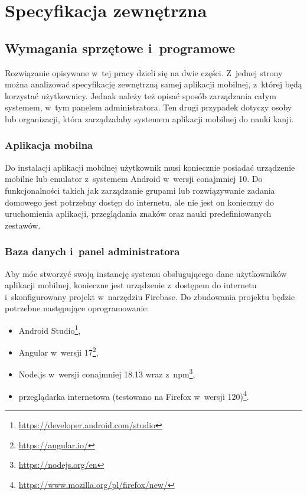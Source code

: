 \documentclass[a4paper,twoside,12pt]{book}
\begin{document}
\chapter{Specyfikacja zewnętrzna}
\label{ch:04}

\section{Wymagania sprzętowe i~programowe}
Rozwiązanie opisywane w~tej pracy dzieli się na dwie części. Z~jednej strony można analizować specyfikację zewnętrzną samej aplikacji mobilnej, z~której będą korzystać użytkownicy. Jednak należy też opisać sposób zarządzania całym systemem, w~tym panelem administratora. Ten drugi przypadek dotyczy osoby lub organizacji, która zarządzałaby systemem aplikacji mobilnej do nauki kanji.

\subsection{Aplikacja mobilna}

Do instalacji aplikacji mobilnej użytkownik musi koniecznie posiadać urządzenie mobilne lub emulator z~systemem Android w~wersji conajmniej 10. Do funkcjonalności takich jak zarządzanie grupami lub rozwiązywanie zadania domowego jest potrzebny dostęp do internetu, ale nie jest on konieczny do uruchomienia aplikacji, przeglądania znaków oraz nauki predefiniowanych zestawów. 

\subsection{Baza danych i~panel administratora}

Aby móc stworzyć swoją instancję systemu obsługującego dane użytkowników aplikacji mobilnej, konieczne jest urządzenie z~dostępem do internetu i~skonfigurowany projekt w~narzędziu Firebase. Do zbudowania projektu będzie potrzebne następujące oprogramowanie:
\begin{itemize}
\item Android Studio\footnote{\url{https://developer.android.com/studio}},
\item Angular w~wersji 17\footnote{\url{https://angular.io/}},
\item Node.js w~wersji conajmniej 18.13 wraz z~npm\footnote{\url{https://nodejs.org/en}},
\item przeglądarka internetowa (testowano na Firefox w~wersji 120)\footnote{\url{https://www.mozilla.org/pl/firefox/new/}}.
\end{itemize}
\end{document}
